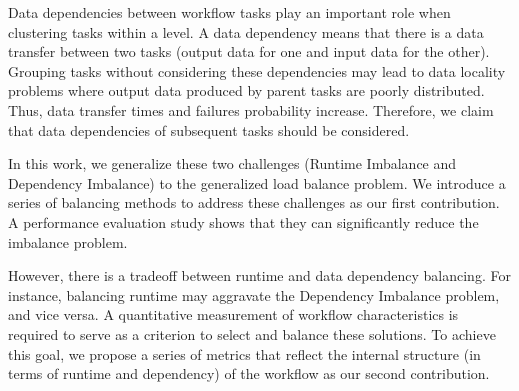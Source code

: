 \documentclass[final]{IEEEtran}
\begin{document}
Data dependencies between workflow tasks play an important role when clustering tasks within a level. A data dependency means that there is a data transfer between two tasks (output data for one and input data for the other). Grouping tasks without considering these dependencies may lead to data locality problems where output data produced by parent tasks are poorly distributed. Thus, data transfer times and failures probability increase.
Therefore, we claim that data dependencies of subsequent tasks should be considered.



In this work, we generalize these two challenges (Runtime Imbalance and Dependency Imbalance) to the generalized load balance problem. We introduce a series of balancing methods to address these challenges as our first contribution. A performance evaluation study shows that they can significantly reduce the imbalance problem.


However, there is a tradeoff between runtime and data dependency balancing. For instance, 
balancing runtime may aggravate the Dependency Imbalance problem, and vice versa. A quantitative measurement of workflow characteristics is required to serve as a criterion to select and balance these solutions. To achieve this goal, we propose a series of metrics that reflect the internal structure (in terms of runtime and dependency) of the workflow as our second contribution. 
\end{document}
